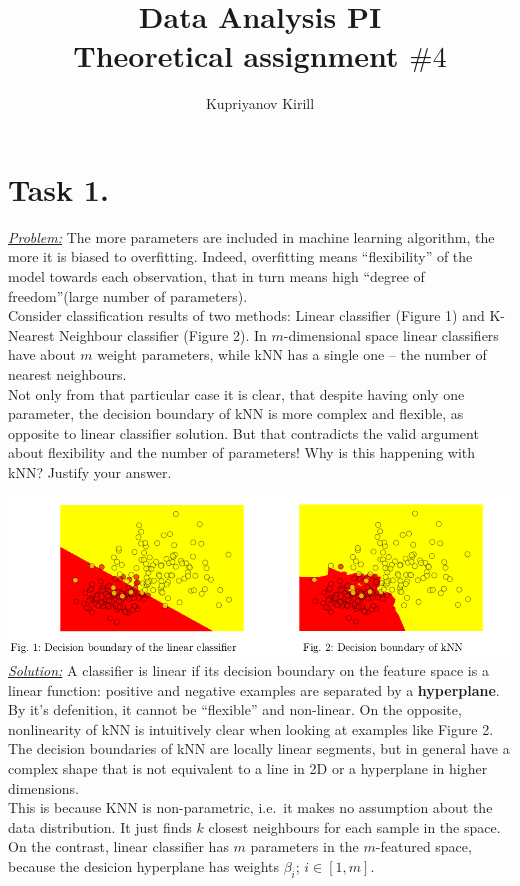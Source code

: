 \documentclass[a4paper,12pt]{article}
\author{Kupriyanov Kirill}
\title{Data Analysis PI\\Theoretical assignment $\#4$}
\date{}
\begin{document}
\maketitle
\thispagestyle{empty}
\newpage
\section*{Task 1.}
\underline{\textit{Problem:}} The more parameters are included in machine
learning algorithm, the more it is biased to overfitting.  Indeed, overfitting
means ``flexibility'' of the model towards each observation, that in turn means
high ``degree of freedom''(large number of parameters).\\
\newline
Consider classification results of two methods: Linear
classifier (Figure 1) and K-Nearest Neighbour classifier (Figure 2). In
\(m\)-dimensional space linear classifiers have about \(m\) weight parameters,
while kNN has a single one – the number of nearest neighbours.\\
\newline
Not only from that particular case it is clear, that despite having only one
parameter, the decision boundary of kNN is more complex and flexible, as
opposite to linear classifier solution. But that contradicts the valid argument
about flexibility and the number of parameters! Why is this happening with kNN?
Justify your answer.

\includegraphics[width=\textwidth]{classifiers}
\newline
\underline{\textit{Solution:}} A classifier is linear if its decision boundary
on the feature space is a linear function: positive and negative examples are
separated by a \textbf{hyperplane}. By it's defenition, it cannot be
``flexible'' and non-linear. On the opposite, nonlinearity of kNN is
intuitively clear when looking at examples like Figure 2. The decision
boundaries of kNN are locally linear segments, but in general have a complex
shape that is not equivalent to a line in 2D or a hyperplane in higher
dimensions.\\
\newline
This is because KNN is non-parametric, i.e.\ it makes no assumption about the
data distribution. It just finds \(k\) closest neighbours for each sample in
the space. On the contrast, linear classifier has \(m\) parameters in the \(m\)-featured space, because the desicion hyperplane has weights \(\beta_i\); \(i\in[1,m]\).
\end{document}
